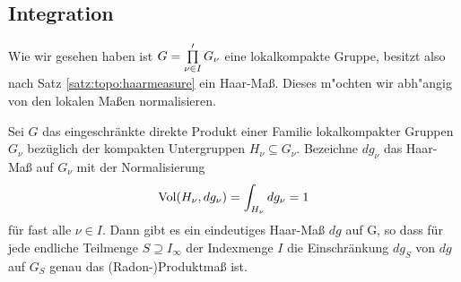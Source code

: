 \subsection{Integration}
		Wie wir gesehen haben ist $G=\prod\limits_{\nu\in I}' G_\nu$ eine lokalkompakte Gruppe, besitzt also nach Satz \ref{satz:topo:haarmeasure} ein Haar-Maß.
		Dieses m"ochten wir abh"angig von den lokalen Maßen normalisieren.
		\begin{satz}
			Sei $G$ das eingeschränkte direkte Produkt einer Familie lokalkompakter Gruppen $G_\nu$ bezüglich der kompakten Untergruppen $H_\nu \subseteq G_\nu$.
			Bezeichne $dg_\nu$ das Haar-Maß auf $G_\nu$ mit der Normalisierung
			\begin{align*}
				\text{Vol}(H_\nu, dg_\nu) = \int_{H_\nu} dg_\nu = 1
			\end{align*}
			für fast alle $\nu\in I$. 
			Dann gibt es ein eindeutiges Haar-Maß $dg$ auf G, so dass für jede endliche Teilmenge $S\supseteq I_\infty$ der Indexmenge $I$ die Einschränkung $dg_S$ von $dg$ auf $G_S$ genau das (Radon-)Produktmaß ist.
		\end{satz}
